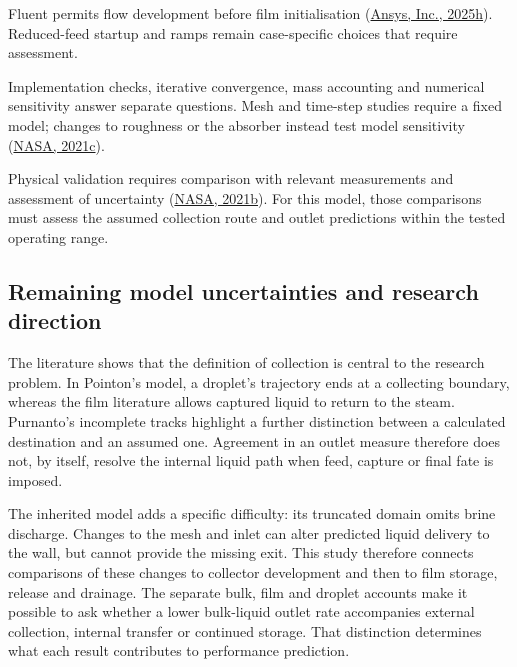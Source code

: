 \documentclass[12pt]{article}
\begin{document}
Fluent permits flow development before film initialisation (\href{https://ansyshelp.ansys.com/public/views/secured/corp/v252/en/flu_ug/flu_ug_ewf_sec_overview.html}{Ansys, Inc., 2025h}). Reduced-feed startup and ramps remain case-specific choices that require assessment.

Implementation checks, iterative convergence, mass accounting and numerical sensitivity answer separate questions. Mesh and time-step studies require a fixed model; changes to roughness or the absorber instead test model sensitivity (\href{https://www.grc.nasa.gov/www/wind/valid/tutorial/verassess.html}{NASA, 2021c}).

Physical validation requires comparison with relevant measurements and assessment of uncertainty (\href{https://www.grc.nasa.gov/www/wind/valid/tutorial/valassess.html}{NASA, 2021b}). For this model, those comparisons must assess the assumed collection route and outlet predictions within the tested operating range.

\subsection{Remaining model uncertainties and research direction}\label{remaining-model-uncertainties-and-research-direction}

The literature shows that the definition of collection is central to the research problem. In Pointon's model, a droplet's trajectory ends at a collecting boundary, whereas the film literature allows captured liquid to return to the steam. Purnanto's incomplete tracks highlight a further distinction between a calculated destination and an assumed one. Agreement in an outlet measure therefore does not, by itself, resolve the internal liquid path when feed, capture or final fate is imposed.

The inherited model adds a specific difficulty: its truncated domain omits brine discharge. Changes to the mesh and inlet can alter predicted liquid delivery to the wall, but cannot provide the missing exit. This study therefore connects comparisons of these changes to collector development and then to film storage, release and drainage. The separate bulk, film and droplet accounts make it possible to ask whether a lower bulk-liquid outlet rate accompanies external collection, internal transfer or continued storage. That distinction determines what each result contributes to performance prediction.

\end{document}
